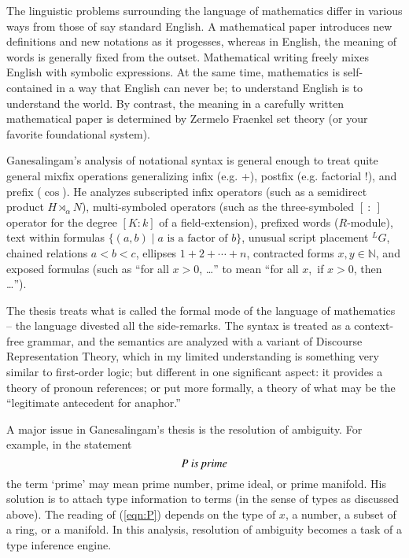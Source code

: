 \documentclass{llncs}
\newcommand{\ring}[1]{\mathbb{#1}}
\begin{document}

The linguistic problems surrounding the language of mathematics differ
in various ways  from those of say standard English.  A
mathematical paper introduces new definitions and new notations as it
progesses, whereas in English, the meaning of words is generally
fixed from the outset.  Mathematical writing freely mixes
English with symbolic expressions.  At the same time, mathematics is
self-contained in a way that English can never be; to understand
English is to understand the world.  By contrast, the
meaning in a carefully written mathematical
paper is determined by Zermelo Fraenkel set theory (or your
favorite foundational system).

Ganesalingam's analysis of notational syntax is general enough to treat quite
general mixfix operations generalizing 
infix (e.g. +), postfix (e.g. factorial !), and prefix ($\cos$).  
He analyzes subscripted infix
operators (such as a semidirect product $H\rtimes_\alpha N$),
multi-symboled operators (such as the three-symboled $[~:~]$ operator
for the degree $[K:k]$ of a field-extension), prefixed words
($R$-module), text within formulas $\{(a,b) \mid a \text{~is a factor
  of~} b\}$, unusual script placement ${}^LG$, chained relations
$a<b<c$, ellipses $1+2+\cdots+n$, contracted forms $x,y\in\ring{N}$,
and exposed formulas (such as ``for all $x>0$, \dots'' to mean ``for
all $x$,~if $x>0$, then \dots'').

The thesis treats what is called the formal mode of the language of
mathematics -- the language divested all the side-remarks.  The
syntax is treated as a context-free grammar, and the semantics are
analyzed with a variant of Discourse Representation Theory, which in
my limited understanding is something very similar to first-order
logic; but different in one significant aspect: it provides a theory
of pronoun references; or put more formally, a theory of what may be
the ``legitimate antecedent for anaphor.''

A major issue in Ganesalingam's thesis is the resolution of ambiguity.
For example, in the statement
\begin{equation}\label{eqn:P}
P \text{\it ~is prime}
\end{equation}
 the term `prime' may mean prime number, prime ideal, or prime
manifold.  His solution is to attach type information to terms (in the
sense of types as discussed above).  The reading of (\ref{eqn:P})
depends on the type of $x$, a number, a subset of a ring, or a
manifold.  In this analysis, resolution of ambiguity becomes a task of
a type inference engine.  
\end{document}
